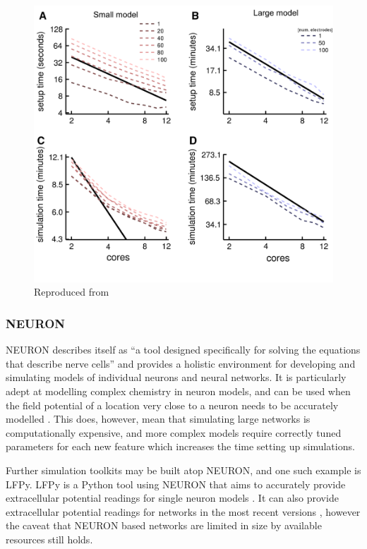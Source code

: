 \begin{figure}[h!]
    \centering
    \includegraphics{figures/graphs/coresVERTEX.png}
     {\small{Reproduced from \cite{tomsett_virtual_2015}}}
    \label{VERTEXparallel}
\end{figure}
\vspace{1ex}

\FloatBarrier

\subsubsection{NEURON}

NEURON describes itself as ``a tool designed specifically for solving the
equations that describe nerve cells'' and provides a holistic environment for
developing and simulating models of individual neurons and neural networks. It
is particularly adept at modelling complex chemistry in neuron models, and can
be used when the field potential of a location very close to a neuron needs to
be accurately modelled \autocite{carnevale_neuron_2006}. This does, however,
mean that simulating large networks is computationally expensive, and more
complex models require correctly tuned parameters for each new feature which
increases the time setting up simulations.

Further simulation toolkits may be built atop NEURON, and one such example is
LFPy. LFPy is a Python tool using NEURON that aims to accurately provide
extracellular potential readings for single neuron models
\autocite{hagen_hybrid_2016}. It can also provide extracellular potential
readings for networks in the most recent versions \autocite{hagen_lfpy_2019},
however the caveat that NEURON based networks are limited in size by available
resources still holds.

